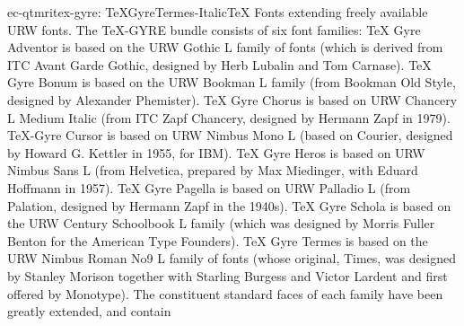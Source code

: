 \documentclass{ddltxtyp}
\begin{document}
\begin{package}{ec-qtmri}{tex-gyre: TeXGyreTermes-Italic}{{\TeX} Fonts extending freely available URW fonts.}
The {\TeX}-GYRE bundle consists of six font families: {\TeX} Gyre
Adventor is based on the URW Gothic L family of fonts (which is
derived from ITC Avant Garde Gothic, designed by Herb Lubalin
and Tom Carnase). {\TeX} Gyre Bonum is based on the URW Bookman L
family (from Bookman Old Style, designed by Alexander
Phemister). {\TeX} Gyre Chorus is based on URW Chancery L Medium
Italic (from ITC Zapf Chancery, designed by Hermann Zapf in
1979). {\TeX}-Gyre Cursor is based on URW Nimbus Mono L (based on
Courier, designed by Howard G. Kettler in 1955, for IBM). {\TeX}
Gyre Heros is based on URW Nimbus Sans L (from Helvetica,
prepared by Max Miedinger, with Eduard Hoffmann in 1957). {\TeX}
Gyre Pagella is based on URW Palladio L (from Palation,
designed by Hermann Zapf in the 1940s). {\TeX} Gyre Schola is
based on the URW Century Schoolbook L family (which was
designed by Morris Fuller Benton for the American Type
Founders). {\TeX} Gyre Termes is based on the URW Nimbus Roman No9
L family of fonts (whose original, Times, was designed by
Stanley Morison together with Starling Burgess and Victor
Lardent and first offered by Monotype). The constituent
standard faces of each family have been greatly extended, and
contain %
\end{package}
\end{document}
